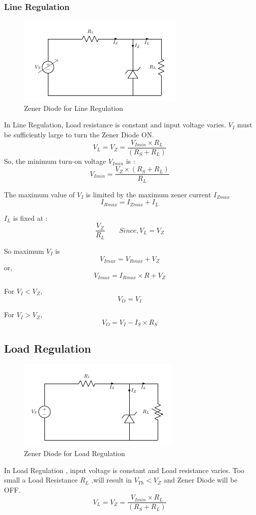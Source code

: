 			\subsubsection{Line Regulation}
				\begin{figure}[h]
					\centering
					\includegraphics[width=0.5\linewidth]{img/exp8/3}
					\caption{Zener Diode for Line Regulation}
					\label{fig:zener_lineRegulation}
				\end{figure}
				In Line Regulation, Load resistance is constant and input voltage varies. \(V_I\) must be sufficiently large to turn the Zener Diode ON.
				$$V_L = V_Z= \frac{V_{Imin} \times R_L}{(R_S + R_L)}$$
				So, the minimum turn-on voltage \(V_{Imin}\) is :
				$$ V_{Imin}= \frac{V_Z \times (R_S + R_L)}{R_L}$$
				
				The maximum value of \(V_I\) is limited by the maximum zener current \(I_{Zmax}\)
				$$I_{Rmax}= I_{Zmax} + I_L $$
				
				\(I_L\) is fixed at :
				$$\frac{V_Z}{R_L} \qquad Since, V_L=V_Z $$
				
				So maximum \(V_I\) is
				$$ V_{Imax} = V_{Rmax} + V_Z$$
				or,
				$$V_{Imax} = I_{Rmax} \times R + V_Z$$
				
				For \(V_I < V_Z\),
				$$ V_O= V_I$$
				
				For \(V_I > V_Z\),
				$$ V_O = V_I − I_S \times R_S$$
			
			\subsection{Load Regulation}
				\begin{figure}[h]
					\centering
					\includegraphics[width=0.5\linewidth]{img/exp8/4}
					\caption{Zener Diode for Load Regulation}
					\label{fig:zener_loadRegulation}
				\end{figure}
				In Load Regulation , input voltage is constant and Load resistance varies. Too small a Load Resistance \(R_L\) ,will result in \(V_{Th} < V_Z\) and Zener Diode will be OFF.
				$$V_L = V_Z = \frac{V_{Imin} \times R_L}{(R_S + R_L)}$$
				
